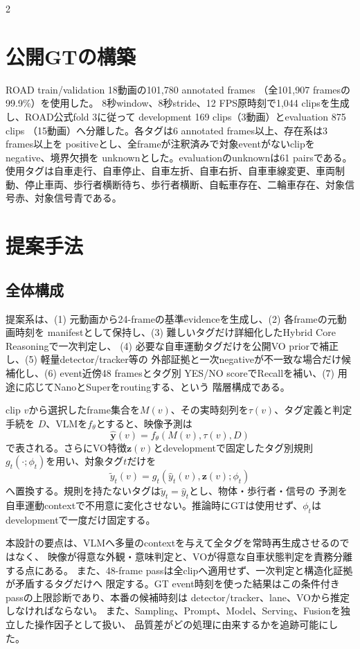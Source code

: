 \documentclass[9pt,a4paper]{extarticle}
\begin{document}
\begin{multicols}{2}
\section{公開GTの構築}
ROAD train/validation 18動画の101,780 annotated frames
（全101,907 framesの99.9\%）を使用した。
8秒window、8秒stride、12 FPS原時刻で1,044 clipsを生成し、ROAD公式fold 3に従って
development 169 clips（3動画）とevaluation 875 clips
（15動画）へ分離した。各タグは6 annotated frames以上、存在系は3 frames以上を
positiveとし、全frameが注釈済みで対象eventがないclipをnegative、境界欠損を
unknownとした。evaluationのunknownは61 pairsである。
使用タグは自車走行、自車停止、自車左折、自車右折、自車車線変更、車両制動、停止車両、歩行者横断待ち、歩行者横断、自転車存在、二輪車存在、対象信号赤、対象信号青である。

\section{提案手法}
\subsection{全体構成}
提案系は、(1) 元動画から24-frameの基準evidenceを生成し、(2) 各frameの元動画時刻を
manifestとして保持し、(3) 難しいタグだけ詳細化したHybrid Core Reasoningで一次判定し、
(4) 必要な自車運動タグだけを公開VO priorで補正し、(5) 軽量detector/tracker等の
外部証拠と一次negativeが不一致な場合だけ候補化し、(6) event近傍48 framesとタグ別
YES/NO scoreでRecallを補い、(7) 用途に応じてNanoとSuperをroutingする、という
階層構成である。

clip $v$から選択したframe集合を$M(v)$、その実時刻列を$\tau(v)$、タグ定義と判定手続を
$D$、VLMを$f_\theta$とすると、映像予測は
\[
 \hat{\mathbf{y}}(v)=f_\theta\!\left(M(v),\tau(v),D\right)
\]
で表される。さらにVO特徴$\mathbf{z}(v)$とdevelopmentで固定したタグ別規則
$g_t(\cdot;\phi_t)$を用い、対象タグ$t$だけを
\[
 \tilde{y}_t(v)=g_t\!\left(\hat{y}_t(v),\mathbf{z}(v);\phi_t\right)
\]
へ置換する。規則を持たないタグは$\tilde{y}_t=\hat{y}_t$とし、物体・歩行者・信号の
予測を自車運動contextで不用意に変化させない。推論時にGTは使用せず、$\phi_t$は
developmentで一度だけ固定する。

本設計の要点は、VLMへ多量のcontextを与えて全タグを常時再生成させるのではなく、
映像が得意な外観・意味判定と、VOが得意な自車状態判定を責務分離する点にある。
また、48-frame passは全clipへ適用せず、一次判定と構造化証拠が矛盾するタグだけへ
限定する。GT event時刻を使った結果はこの条件付きpassの上限診断であり、本番の候補時刻は
detector/tracker、lane、VOから推定しなければならない。
また、Sampling、Prompt、Model、Serving、Fusionを独立した操作因子として扱い、
品質差がどの処理に由来するかを追跡可能にした。


\end{multicols}
\end{document}
